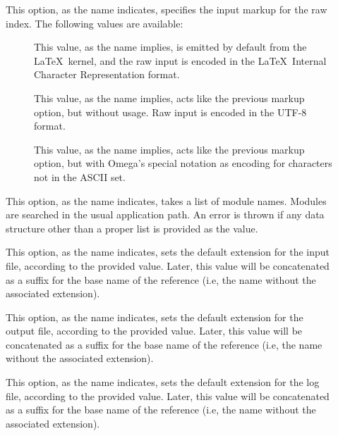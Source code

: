 \begin{description}
\begin{description}
\item[] This option, as the name indicates, specifies the input markup for the raw index. The following values are available:

\begin{description}
\item[] This value, as the name implies, is emitted by default from the \LaTeX\ kernel, and the raw input is encoded in the \LaTeX\ Internal Character Representation format.

\item[] This value, as the name implies, acts like the previous  markup option, but without  usage. Raw input is encoded in the UTF-8 format.

\item[] This value, as the name implies, acts like the previous  markup option, but with Omega's special notation as encoding for characters not in the ASCII set.
\end{description}

\item[] This option, as the name indicates, takes a list of module names. Modules are searched in the usual application path. An error is thrown if any data structure other than a proper list is provided as the value.

\item[] This option, as the name indicates, sets the default extension for the input file, according to the provided value. Later, this value will be concatenated as a suffix for the base name of the  reference (i.e, the name without the associated extension).

\item[] This option, as the name indicates, sets the default extension for the output file, according to the provided value. Later, this value will be concatenated as a suffix for the base name of the  reference (i.e, the name without the associated extension).

\item[] This option, as the name indicates, sets the default extension for the log file, according to the provided value. Later, this value will be concatenated as a suffix for the base name of the  reference (i.e, the name without the associated extension).


\end{description}
\end{description}
